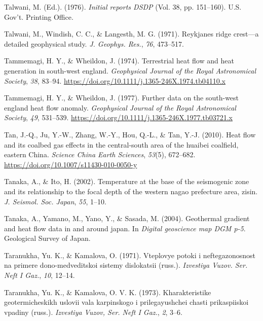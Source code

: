 \documentclass[draft,linenumbers]{agujournal2018}
\begin{document}
\leavevmode{}%
Talwani, M. (Ed.). (1976). \emph{Initial reports DSDP} (Vol. 38, pp.
151--160). U.S. Gov't. Printing Office.

\leavevmode{}%
Talwani, M., Windish, C. C., \& Langesth, M. G. (1971). Reykjanes ridge
crest---a detailed geophysical study. \emph{J. Geophys. Res.},
\emph{76}, 473--517.

\leavevmode{}%
Tammemagi, H. Y., \& Wheildon, J. (1974). Terrestrial heat flow and heat
generation in south-west england. \emph{Geophysical Journal of the Royal
Astronomical Society}, \emph{38}, 83--94.
\url{https://doi.org/10.1111/j.1365-246X.1974.tb04110.x}

\leavevmode{}%
Tammemagi, H. Y., \& Wheildon, J. (1977). Further data on the south-west
england heat flow anomaly. \emph{Geophysical Journal of the Royal
Astronomical Society}, \emph{49}, 531--539.
\url{https://doi.org/10.1111/j.1365-246X.1977.tb03721.x}

\leavevmode{}%
Tan, J.-Q., Ju, Y.-W., Zhang, W.-Y., Hou, Q.-L., \& Tan, Y.-J. (2010).
Heat flow and its coalbed gas effects in the central-south area of the
huaibei coalfield, eastern {China}. \emph{Science China Earth Sciences},
\emph{53}(5), 672--682. \url{https://doi.org/10.1007/s11430-010-0050-y}

\leavevmode{}%
Tanaka, A., \& Ito, H. (2002). Temperature at the base of the
seismogenic zone and its relationship to the focal depth of the western
nagao prefecture area, zisin. \emph{J. Seismol. Soc. Japan}, \emph{55},
1--10.

\leavevmode{}%
Tanaka, A., Yamano, M., Yano, Y., \& Sasada, M. (2004). Geothermal
gradient and heat flow data in and around japan. In \emph{Digital
geoscience map DGM p-5}. Geological Survey of Japan.

\leavevmode{}%
Taranukha, Yu. K., \& Kamalova, O. (1971). Vteplovye potoki i
neftegazonosnost na primere dono-medveditskoi sistemy dislokatsii
(russ.). \emph{Izvestiya Vuzov. Ser. Neft I Gaz.}, \emph{10}, 12--14.

\leavevmode{}%
Taranukha, Yu. K., \& Kamalova, O. V. K. (1973). Kharakteristike
geotermicheskikh uslovii vala karpinskogo i prilegayushchei chasti
prikaspiiskoi vpadiny (russ.). \emph{Izvestiya Vuzov, Ser. Neft I Gaz.},
\emph{2}, 3--6.
\end{document}
